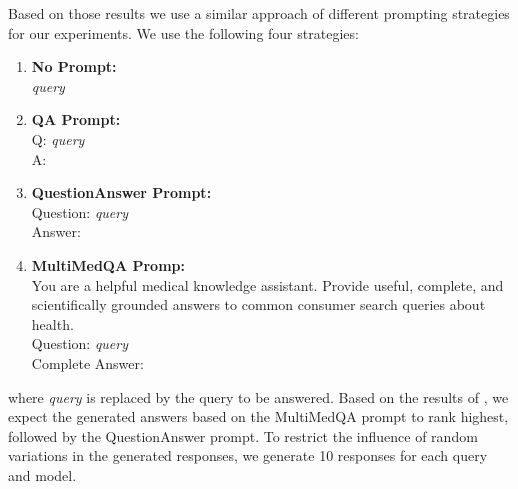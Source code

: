 Based on those results we use a similar approach of different prompting strategies for our experiments.
We use the following four strategies:
\begin{enumerate}
    \item \textbf{No Prompt:}\\ \textit{query}
    \item \textbf{QA Prompt:}\\ Q: \textit{query}\\A:
    \item \textbf{QuestionAnswer Prompt:}\\ Question: \textit{query}\\Answer:
    \item \textbf{MultiMedQA Promp:}\\ You are a helpful medical knowledge assistant. Provide useful, complete, and scientifically grounded answers to common consumer search queries about health.\\Question: \textit{query}\\Complete Answer:
\end{enumerate}
where \textit{query} is replaced by the query to be answered.
Based on the results of \cite{reynolds:2021:Prompt}, we expect the generated answers based on the MultiMedQA prompt to rank highest, followed by the QuestionAnswer prompt.
To restrict the influence of random variations in the generated responses, we generate 10 responses for each query and model.


